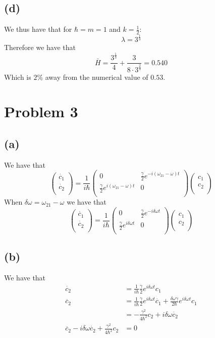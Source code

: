 \documentclass[11pt]{article}
\begin{document}
\subsection*{(d)}
We thus have that for $\hbar = m = 1$ and $k=\frac{1}{2}$:
$$\lambda = 3^\frac{1}{3}$$
Therefore we have that 
$$\bar{H} =  \frac{3^\frac{1}{3}}{4}+\frac{3}{8\cdot3^\frac{2}{3}} = \boxed{0.540}$$
Which is $\boxed{2\%}$ away from the numerical value of $0.53$.
\section*{Problem 3}
\subsection*{(a)}
We have that 
$$
    \begin{pmatrix}
        \dot{c_1}\\
        \dot{c_2}\\
    \end{pmatrix}=
    \frac{1}{i\hbar}
    \begin{pmatrix}
        0 & \frac{\gamma}{2}e^{-i(\omega_{21}-\omega)t}\\
        \frac{\gamma}{2}e^{i(\omega_{21}-\omega)t} & 0\\
    \end{pmatrix}
    \begin{pmatrix}
        c_1\\
        c_2\\
    \end{pmatrix}
$$
When $\delta \omega = \omega_{21}-\omega$ we have that 
$$
    \begin{pmatrix}
        \dot{c_1}\\
        \dot{c_2}\\
    \end{pmatrix}=
    \frac{1}{i\hbar}
    \begin{pmatrix}
        0 & \frac{\gamma}{2}e^{-i\delta\omega t}\\
        \frac{\gamma}{2}e^{i\delta\omega t} & 0\\
    \end{pmatrix}
    \begin{pmatrix}
        c_1\\
        c_2\\
    \end{pmatrix}
$$
\subsection*{(b)}
We have that 
\begin{align*}
    \dot{c_2}&=\frac{1}{i\hbar}\frac{\gamma}{2}e^{i\delta\omega t}c_1\\
    \ddot{c_2}&=\frac{1}{i\hbar}\frac{\gamma}{2}e^{i\delta\omega t}\dot{c_1}+\frac{\delta\omega\gamma}{2\hbar}e^{i\delta\omega t}c_1\\
    &=-\frac{\gamma^2}{4\hbar^2}c_2+i\delta\omega \dot{c_2}\\
    \ddot{c_2}-i\delta\omega \dot{c_2}+\frac{\gamma^2}{4\hbar^2}c_2&=0
\end{align*}
\end{document}
